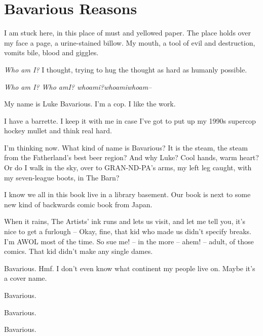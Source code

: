 \chapter{Bavarious Reasons}





I am stuck here, in this place of must and yellowed paper. The
place holds over my face a page, a urine-stained billow. My mouth,
a tool of evil and destruction, vomits bile, blood and
giggles.



{\em Who am I?} I thought, trying to hug the thought as hard as
humanly possible.



{\em Who am I? Who amI? whoami?whoamiwhoam--}





My name is Luke Bavarious. I'm a cop. I like the work.



I have a barrette. I keep it with me in case I've got to put up my
1990s supercop hockey mullet and think real hard.



I'm thinking now. What kind of name is Bavarious? It is the steam,
the steam from the Fatherland's best beer region? And why Luke?
Cool hands, warm heart? Or do I walk in the sky, over to
GRAN-ND-PA's arms, my left leg caught, with my seven-league boots,
in The Barn?



I know we all in this book live in a library basement. Our book is
next to some new kind of backwards comic book from Japan.



When it rains, The Artists' ink runs and lets us visit, and let me
tell you, it's nice to get a furlough -- Okay, fine, that kid who
made us didn't specify breaks. I'm AWOL most of the time. So sue
me! -- in the more -- ahem! -- adult, of those comics. That kid
didn't make any single dames.



Bavarious. Hmf. I don't even know what continent my people live on.
Maybe it's a cover name.



Bavarious.



Bavarious.



Bavarious.




